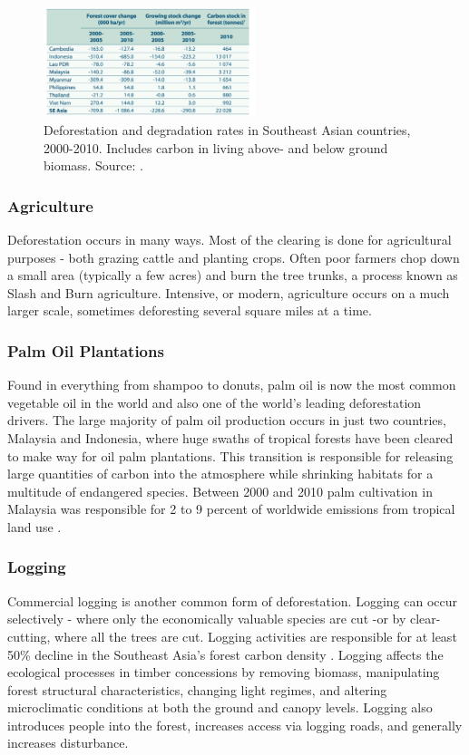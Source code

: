     \begin{figure}[ht]
    \centering
        \includegraphics[width = 0.55\textwidth]{graphics/carbonstock.png}
        \caption{Deforestation and degradation rates in Southeast Asian countries, 2000-2010. Includes carbon in living above- and below ground biomass. Source: \citep{faoun163agriculture}.}
				\label{fig:deforestation}
    \end{figure}

\subsubsection {Agriculture}
Deforestation occurs in many ways. Most of the clearing is done for agricultural purposes - both grazing cattle and planting crops. Often poor farmers chop down a small area (typically a few acres) and burn the tree trunks, a process known as Slash and Burn agriculture. Intensive, or modern, agriculture occurs on a much larger scale, sometimes deforesting several square miles at a time.

\subsubsection{Palm Oil Plantations}
Found in everything from shampoo to donuts, palm oil is now the most common vegetable oil in the world and also one of the world's leading deforestation drivers. The large majority of palm oil production occurs in just two countries, Malaysia and Indonesia, where huge swaths of tropical forests have been cleared to make way for oil palm plantations. This transition is responsible for releasing large quantities of carbon into the atmosphere while shrinking habitats for a multitude of endangered species. Between 2000 and 2010 palm cultivation in Malaysia was responsible for 2 to 9 percent of worldwide emissions from tropical land use \citep{carlson2013refined}. 


\subsubsection {Logging}Commercial logging is another common form of deforestation. Logging can occur selectively - where only the economically valuable species are cut  -or by clear-cutting, where all the trees are cut. Logging activities are responsible for at least 50\% decline in the Southeast Asia's forest carbon density \citep{hawthorne2011impact}. Logging affects the ecological processes in timber concessions by removing biomass, manipulating forest structural characteristics, changing light regimes, and altering microclimatic conditions at both the ground and canopy levels. Logging also introduces people into the forest, increases access via logging roads, and generally increases disturbance. 

